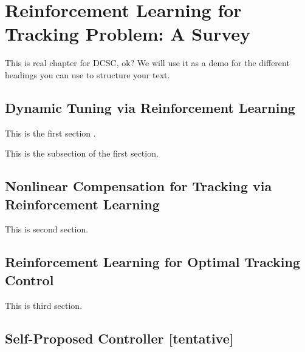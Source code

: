 %
\chapter{Reinforcement Learning for Tracking Problem: A Survey} \label{chap::survey}

This is real chapter for \ac{DCSC}, ok? We will use it as a demo for the different headings you can use to structure your text.


\section{Dynamic Tuning via Reinforcement Learning}
This is the first section .

This is the subsection of the first section.

\section{Nonlinear Compensation for Tracking via Reinforcement Learning}
This is second section.

\section{Reinforcement Learning for Optimal Tracking Control}
This is third section.

\section{Self-Proposed Controller [tentative]}

